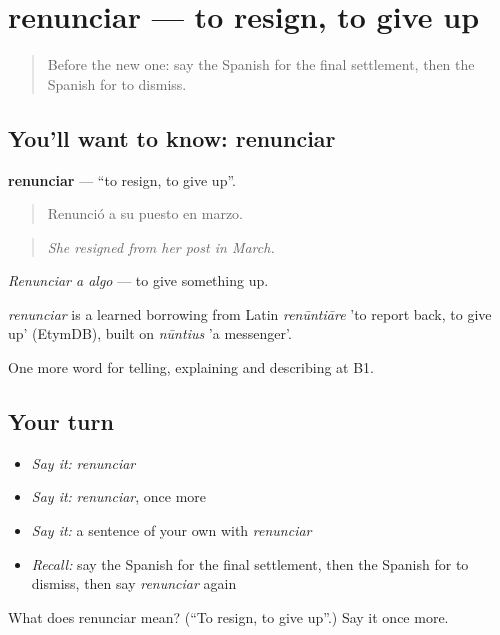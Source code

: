 \section[renunciar]{renunciar — to resign, to give up}

\label{lesson:ES-C553-renunciar}



\begin{quote}
Before the new one: say the Spanish for the final settlement, then the Spanish for to dismiss.
\end{quote}

\subsection*{You'll want to know: renunciar}
\textbf{renunciar} — \textquotedblleft{}to resign, to give up\textquotedblright{}.

\begin{quote}
Renunció a su puesto en marzo.
\end{quote}

\begin{quote}
\emph{She resigned from her post in March.}
\end{quote}

\emph{Renunciar a algo} — to give something up.

\begin{cousinweb}
\emph{renunciar} is a learned borrowing from Latin \emph{renūntiāre} 'to report back, to give up' (EtymDB), built on \emph{nūntius} 'a messenger'.
\end{cousinweb}

\begin{grammarlens}[title={What you've built}]
One more word for telling, explaining and describing at B1.
\end{grammarlens}

\subsection*{Your turn}
\begin{itemize}
\raggedright
  \item \emph{Say it:} \emph{renunciar}
  \item \emph{Say it:} \emph{renunciar}, once more
  \item \emph{Say it:} a sentence of your own with \emph{renunciar}
  \item \emph{Recall:} say the Spanish for the final settlement, then the Spanish for to dismiss, then say \emph{renunciar} again
\end{itemize}

\begin{tcolorbox}[breakable,colback=teal!4,colframe=teal!35!black,title={Before you move on}]
What does renunciar mean? (\textquotedblleft{}To resign, to give up\textquotedblright{}.) Say it once more.
\end{tcolorbox}
